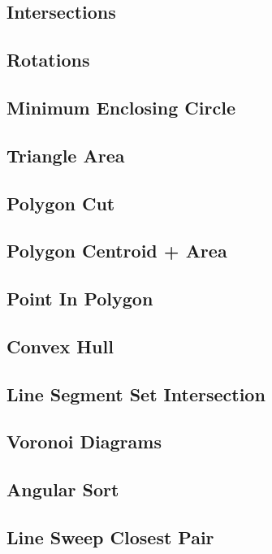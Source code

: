 		\subsection{Intersections}
			
		\subsection{Rotations}
			
		\subsection{Minimum Enclosing Circle}
			
		\subsection{Triangle Area}
			
		\subsection{Polygon Cut}
			
		\subsection{Polygon Centroid + Area}
			
		\subsection{Point In Polygon}
			
		\subsection{Convex Hull}
			
		\subsection{Line Segment Set Intersection}
			
		\subsection{Voronoi Diagrams}
			
		\subsection{Angular Sort}
			
		\subsection{Line Sweep Closest Pair}
			
